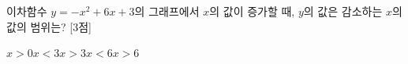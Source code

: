 이차함수 $y=-x^2+6x+3$의 그래프에서 $x$의 값이 증가할 때, $y$의 값은 감소하는 $x$의 값의 범위는? \mbox{[3점]}
\begin{choices32}{$x>0$}{$x<3$}{$x>3$}{$x<6$}{$x>6$}\end{choices32}
